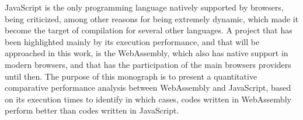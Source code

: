 JavaScript is the only programming language natively supported by browsers, being
criticized, among other reasons for being extremely dynamic, which made it become the
target of compilation for several other languages. A project that has been highlighted
mainly by its execution performance, and that will be approached in this work, is the
WebAssembly, which also has native support in modern browsers, and that has the
participation of the main browsers providers until then. The purpose of this monograph is
to present a quantitative comparative performance analysis between WebAssembly and
JavaScript, based on its execution times to identify in which cases, codes written in
WebAssembly perform better than codes written in JavaScript.

